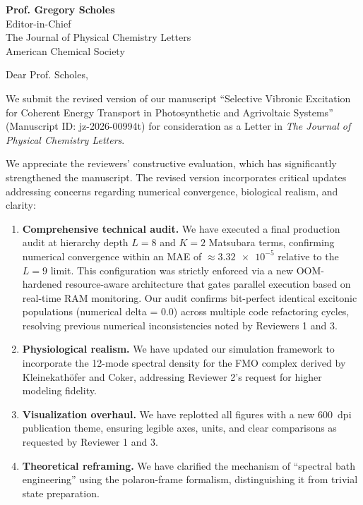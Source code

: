 \documentclass[11pt,a4paper]{letter}
\begin{document}
\begin{letter}{
\textbf{Prof. Gregory Scholes}\\
Editor-in-Chief\\
The Journal of Physical Chemistry Letters\\
American Chemical Society
}

\opening{Dear Prof. Scholes,}

We submit the revised version of our manuscript ``Selective Vibronic Excitation for Coherent Energy Transport in Photosynthetic and Agrivoltaic Systems'' (Manuscript ID: jz-2026-00994t) for consideration as a Letter in \textit{The Journal of Physical Chemistry Letters}.

We appreciate the reviewers' constructive evaluation, which has significantly strengthened the manuscript. The revised version incorporates critical updates addressing concerns regarding numerical convergence, biological realism, and clarity:

\begin{enumerate}
\item \textbf{Comprehensive technical audit.} We have executed a final production audit at hierarchy depth $L=8$ and $K=2$ Matsubara terms, confirming numerical convergence within an MAE of $\approx \num{3.32 e-5}$ relative to the $L=9$ limit. This configuration was strictly enforced via a new OOM-hardened resource-aware architecture that gates parallel execution based on real-time RAM monitoring. Our audit confirms bit-perfect identical excitonic populations (numerical delta = 0.0) across multiple code refactoring cycles, resolving previous numerical inconsistencies noted by Reviewers 1 and 3.

\item \textbf{Physiological realism.} We have updated our simulation framework to incorporate the 12-mode spectral density for the FMO complex derived by Kleinekathöfer and Coker, addressing Reviewer 2's request for higher modeling fidelity.

\item \textbf{Visualization overhaul.} We have replotted all figures with a new \SI{600}{dpi} publication theme, ensuring legible axes, units, and clear comparisons as requested by Reviewer 1 and 3.

\item \textbf{Theoretical reframing.} We have clarified the mechanism of ``spectral bath engineering'' using the polaron-frame formalism, distinguishing it from trivial state preparation.


\end{enumerate}
\end{letter}
\end{document}
